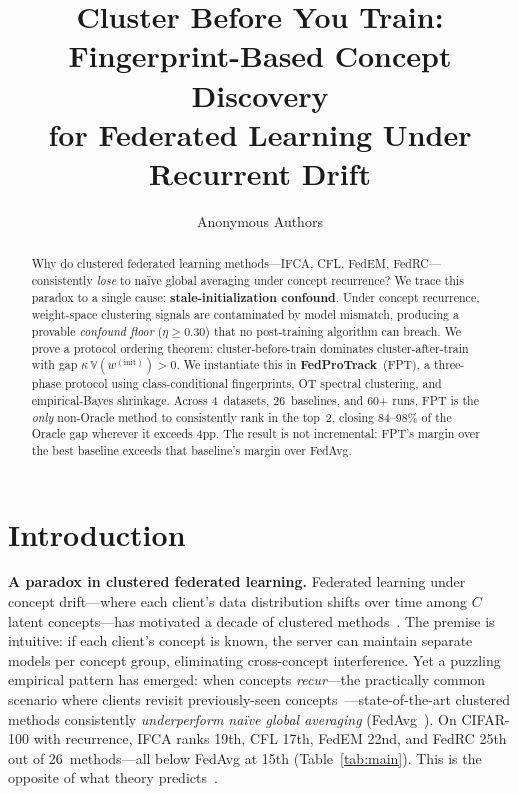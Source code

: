 \documentclass[11pt]{article}
\title{Cluster Before You Train: Fingerprint-Based Concept Discovery\\for Federated Learning Under Recurrent Drift}
\author{Anonymous Authors}
\newcommand{\V}{\mathbb{V}}
\begin{document}
\maketitle

\begin{abstract}
Why do clustered federated learning methods---IFCA, CFL, FedEM, FedRC---consistently \emph{lose} to na\"ive global averaging under concept recurrence?
We trace this paradox to a single cause: \textbf{stale-initialization confound}.
Under concept recurrence, weight-space clustering signals are contaminated by model mismatch, producing a provable \emph{confound floor} ($\eta \ge 0.30$) that no post-training algorithm can breach.
We prove a protocol ordering theorem: cluster-before-train dominates cluster-after-train with gap $\kappa\,\V(w^{(\text{init})})>0$.
We instantiate this in \textbf{FedProTrack}~(FPT), a three-phase protocol using class-conditional fingerprints, OT spectral clustering, and empirical-Bayes shrinkage.
Across 4~datasets, 26~baselines, and 60+ runs, FPT is the \emph{only} non-Oracle method to consistently rank in the top~2, closing 84--98\% of the Oracle gap wherever it exceeds 4pp.
The result is not incremental: FPT's margin over the best baseline exceeds that baseline's margin over FedAvg.
\end{abstract}

\section{Introduction}
\label{sec:intro}

\textbf{A paradox in clustered federated learning.}
Federated learning under concept drift---where each client's data distribution shifts over time among $C$ latent concepts---has motivated a decade of clustered methods~\citep{ghosh2020efficient, sattler2021clustered, marfoq2021federated, guo2024fedrc, licciardi2025fedgwc, kim2024gradient}.
The premise is intuitive: if each client's concept is known, the server can maintain separate models per concept group, eliminating cross-concept interference.
Yet a puzzling empirical pattern has emerged: when concepts \emph{recur}---the practically common scenario where clients revisit previously-seen concepts~\citep{jothimurugesan2023federated, panchal2023flash}---state-of-the-art clustered methods consistently \emph{underperform na\"ive global averaging} (FedAvg~\citep{mcmahan2017communication}).
On CIFAR-100 with recurrence, IFCA ranks 19th, CFL 17th, FedEM 22nd, and FedRC 25th out of 26~methods---all below FedAvg at 15th (Table~\ref{tab:main}).
This is the opposite of what theory predicts~\citep{chen2023minimax, yu2025minimax, mansour2020three}.
\end{document}
